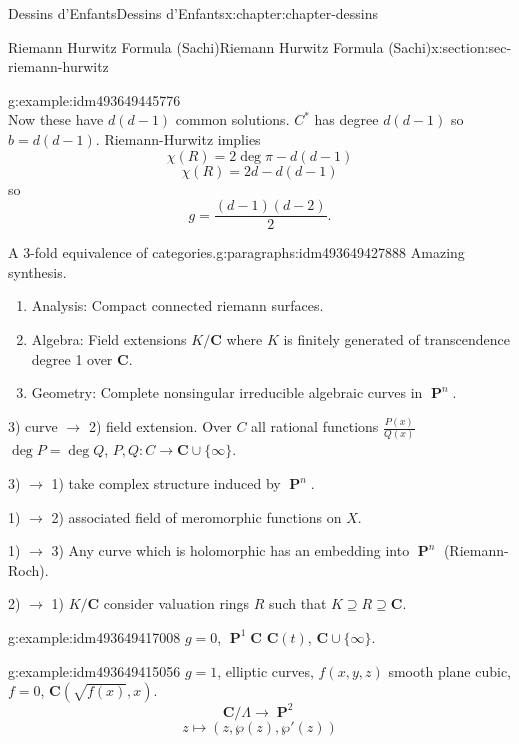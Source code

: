 \documentclass[oneside,10pt,]{book}
\numberwithin{equation}{section}
\newcommand{\CC}{\mathbf{C}}
\DeclareMathOperator{\PP}{\mathbf{P}}
\begin{document}
\begin{chapterptx}{Dessins d'Enfants}{}{Dessins d'Enfants}{}{}{x:chapter:chapter-dessins}
\begin{sectionptx}{Riemann Hurwitz Formula (Sachi)}{}{Riemann Hurwitz Formula (Sachi)}{}{}{x:section:sec-riemann-hurwitz}
\begin{example}{}{g:example:idm493649445776}
\begin{equation*}
\end{equation*}
Now these have \(d(d-1)\) common solutions. \(C^*\) has degree \(d(d-1)\) so \(b = d(d-1)\). Riemann-Hurwitz implies%
\begin{equation*}
\chi(R) = 2\deg \pi - d(d-1)
\end{equation*}
%
\begin{equation*}
\chi(R) = 2d - d(d-1)
\end{equation*}
so%
\begin{equation*}
g=  \frac{(d-1)(d-2)}{2}\text{.}
\end{equation*}
%
\end{example}
\begin{paragraphs}{A 3-fold equivalence of categories.}{g:paragraphs:idm493649427888}%
Amazing synthesis.%
\begin{enumerate}
\item{}Analysis: Compact connected riemann surfaces.%
\item{}Algebra: Field extensions \(K/\CC\) where \(K\) is finitely generated of transcendence degree 1 over \(\CC\).%
\item{}Geometry: Complete nonsingular irreducible algebraic curves in \(\PP^n\).%
\end{enumerate}
%
\par
3) curve \(\to\) 2) field extension. Over \(C\) all rational functions \(\frac{P(x)}{Q(x)}\) \(\deg P= \deg Q\), \(P,Q \colon C\to \CC \cup \{\infty\}\).%
\par
3) \(\to\) 1) take complex structure induced by \(\PP^n\).%
\par
1) \(\to\) 2) associated field of meromorphic functions on \(X\).%
\par
1) \(\to\) 3) Any curve which is holomorphic has an embedding into \(\PP^n\) (Riemann-Roch).%
\par
2) \(\to\) 1) \(K/\CC\) consider valuation rings \(R\) such that \(K\supseteq R\supseteq \CC\).%
\begin{example}{}{g:example:idm493649417008}%
\(g =0\), \(\PP^1 \CC\) \(\CC(t)\), \(\CC\cup \{\infty\}\).%
\end{example}
\begin{example}{}{g:example:idm493649415056}%
\(g =1\), elliptic curves, \(f(x,y,z)\) smooth plane cubic, \(f= 0\), \(\CC(\sqrt{f(x)}, x)\).%
\begin{equation*}
\CC/\Lambda \to \PP^2
\end{equation*}
%
\begin{equation*}
z\mapsto (z,\wp(z), \wp'(z))

\end{equation*}
\end{example}
\end{paragraphs}
\end{sectionptx}
\end{chapterptx}
\end{document}
